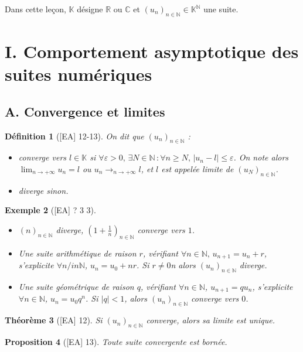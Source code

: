 \documentclass[10pt, a4paper, parskip=full, twoside, twocolumn]{report}
\newtheorem{definition}{Définition}
\newtheorem{theorem}[definition]{Théorème}
\newtheorem{proposition}[definition]{Proposition}
\newtheorem{example}[definition]{Exemple}
\newcommand{\IN}{\mathbb{N}}
\newcommand{\IK}{\mathbb{K}}
\newcommand{\IC}{\mathbb{C}}
\newcommand{\IR}{\mathbb{R}}
\begin{document}
\textcolor{paragraphtext}{Dans cette leçon, $\IK$ désigne $\IR$ ou $\IC$ et $\left(u_n\right)_{n\in\IN}\in\IK^{\IN}$ une suite.}

\section*{I. Comportement asymptotique des suites numériques}
\subsection*{A. Convergence et limites}

\begin{definition}[\textnormal{[EA] 12-13}]
	On dit que $\left(u_n\right)_{n\in\IN}$ :
	\begin{itemize}
		\item \emph{converge vers $l\in\IK$} si $\forall \varepsilon >0,\, \exists N\in\IN\,\colon \forall n\geq N,\, \vert u_n - l\vert \leq \varepsilon$. On note alors $\lim_{n\to +\infty} u_n = l$ ou $u_n\longrightarrow_{n\to +\infty} l$, et $l$ est appelée \emph{limite de $\left(u_N\right)_{n\in\IN}$.}
		\item \emph{diverge} sinon.
	\end{itemize}
\end{definition}

\begin{example}[\textnormal{[EA] ? 3 3}]
	\begin{itemize}
		\item $\left(n\right)_{n\in\IN}$ diverge, $\left(1+\frac{1}{n}\right)_{n\in\IN}$ converge vers $1$.
		\item Une \emph{suite arithmétique de raison $r$}, vérifiant $\forall n\in\IN,\, u_{n+1} = u_n + r$, s'explicite $\forall n/in \IN$, $u_n = u_0+nr$. Si $r \neq 0$n alors $\left(u_n\right)_{n\in \IN}$ diverge.
		\item Une \emph{suite géométrique de raison $q$}, vérifiant $\forall n\in \IN$, $u_{n+1} = qu_n$, s'explicite $\forall n\in\IN$, $u_n = u_0q^n$. Si $\vert q\vert < 1$, alors $\left(u_n\right)_{n\in\IN}$ converge vers $0$.
	\end{itemize}
\end{example}

\begin{theorem}[\textnormal{[EA] 12}]
	Si $\left(u_n\right)_{n\in\IN}$ converge, alors sa limite est unique.
\end{theorem}

\begin{proposition}[\textnormal{[EA] 13}]
	Toute suite convergente est bornée.
\end{proposition}
\end{document}
